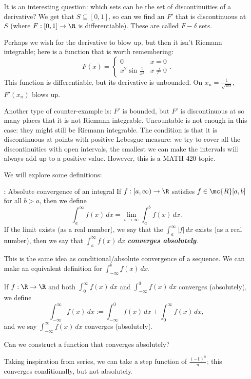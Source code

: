 \medskip

It is an interesting question: which sets can be the set of discontinuities of a derivative? We get that \(S\subseteq [0,1]\), so can we find an \(F'\) that is discontinuous at \(S\) (where \(F:[0,1]\to\R\) is differentiable). These are called \(F-\delta\) sets.

\medskip

Perhaps we wish for the derivative to blow up, but then it isn't Riemann integrable; here is a function that is worth remembering:
\begin{equation*}
	F(x)=\begin{cases}
			0&x=0\\
			x^2\sin{\frac{1}{x^2}}&x\neq 0
		 \end{cases}.
\end{equation*}
This function is differentiable, but its derivative is unbounded. On \(x_n=\displaystyle\frac{1}{\sqrt{\pi n}}\), \(F'(x_n)\) blows up.

\medskip

Another type of counter-example is: \(F'\) is bounded, but \(F'\) is discontinuous at so many places that it is not Riemann integrable. Uncountable is not enough in this case: they might still be Riemann integrable. The condition is that it is discontinuous at points with positive Lebesgue measure: we try to cover all the discontinuities with open intervals, the smallest we can make the intervals will always add up to a positive value. However, this is a MATH 420 topic.

\medskip

We will explore some definitions:
\begin{ndef}{: Absolute convergence of an integral}
	If \(f:[a,\infty)\to\R\) satisfies \(f\in\mc{R}[a,b]\) for all \(b>a\), then we define 
	\begin{equation*}
		\int_a^{\infty} f(x) \, dx=\lim_{b\to\infty}\int_a^b f(x) \, dx.
	\end{equation*}
	If the limit exists (as a real number), we say that the \(\displaystyle\int_a^{\infty}|f| \, dx\) exists (as a real number), then we say that \(\displaystyle\int_a^{\infty}f(x) \, dx\) \emph{\textbf{converges absolutely}}.
\end{ndef}
\begin{note}
	This is the same idea as conditional/absolute convergence of a sequence. We can make an equivalent definition for \(\displaystyle\int_{-\infty}^b f(x) \, dx\).
\end{note}
If \(f:\R\to\R\) and both \(\displaystyle\int_0^{\infty}f(x) \, dx\) and \(\displaystyle\int_{-\infty}^0 f(x) \, dx\) converges (absolutely), we define 
\begin{equation*}
	\int_{-\infty}^{\infty} f(x) \, dx:=\int_{-\infty}^0 f(x) \, dx+\int_0^{\infty}f(x) \, dx,
\end{equation*}
and we say \(\displaystyle\int_{-\infty}^{\infty} f(x) \, dx\) converges (absolutely).
\begin{fft}
	Can we construct a function that converges absolutely? 
\end{fft}
Taking inspiration from series, we can take a step function of \(\displaystyle\frac{(-1)^n}{n}\); this converges conditionally, but not absolutely.